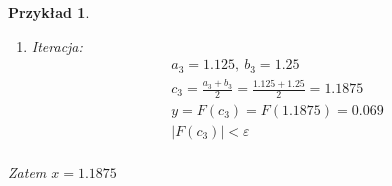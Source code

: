 \documentclass[12pt]{article}
\newtheorem{example}{Przykład}
\begin{document}
\begin{example}
\begin{enumerate}
    \item Iteracja:\\
    \begin{align*}
        &a_3=1.125,\ b_3=1.25\\
        &c_3=\frac{a_3+b_3}{2}=\frac{1.125+1.25}{2}=1.1875\\
        &y=F(c_3)=F(1.1875)=0.069\\
        &|F(c_3)|<\varepsilon\\
    \end{align*}
\end{enumerate}

Zatem $x=1.1875$
\end{example}
\end{document}
